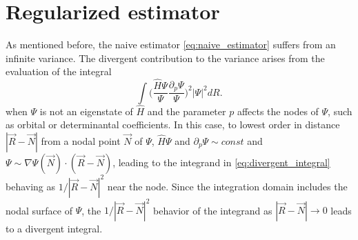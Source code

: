 \documentclass[twocolumn]{revtex4-1}
\begin{document}
\section{Regularized estimator}
As mentioned before, the naive estimator \eqref{eq:naive_estimator} suffers from an infinite variance. 
The divergent contribution to the variance arises from the evaluation of the integral
\begin{equation}
\int \Big(\frac{\hat{H}\Psi}{\Psi}\frac{\partial_p\Psi}{\Psi}\Big)^2 |\Psi|^2 dR.
\label{eq:divergent_integral}
\end{equation}
when $\Psi$ is not an eigenstate of $\hat{H}$ and the parameter $p$ affects the nodes of $\Psi$, such as orbital or determinantal coefficients.
In this case, to lowest order in distance $|\vec{R}-\vec{N}|$ from a nodal point $\vec{N}$ of $\Psi$, $\hat{H}\Psi$ and $\partial_p \Psi \sim const$ and $\Psi \sim \nabla \Psi(\vec{N}) \cdot (\vec{R} - \vec{N})$, leading to the integrand in \eqref{eq:divergent_integral} behaving as $1/|\vec{R}-\vec{N}|^2$ near the node.
Since the integration domain includes the nodal surface of $\Psi$, the $1/|\vec{R}-\vec{N}|^2$ behavior of the integrand as $|\vec{R}-\vec{N}|\rightarrow 0$ leads to a divergent integral.
\end{document}
